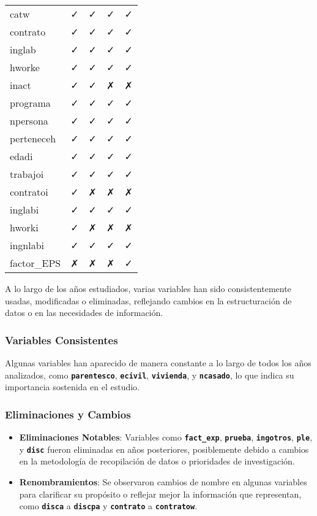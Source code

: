 \documentclass[
]{article}
\begin{document}
\begin{longtable}[]{@{}lllll@{}}
catw & ✓ & ✓ & ✓ & ✓ \\
contrato & ✓ & ✓ & ✓ & ✓ \\
inglab & ✓ & ✓ & ✓ & ✓ \\
hworke & ✓ & ✓ & ✓ & ✓ \\
inact & ✓ & ✓ & ✗ & ✗ \\
programa & ✓ & ✓ & ✓ & ✓ \\
npersona & ✓ & ✓ & ✓ & ✓ \\
perteneceh & ✓ & ✓ & ✓ & ✓ \\
edadi & ✓ & ✓ & ✓ & ✓ \\
trabajoi & ✓ & ✓ & ✓ & ✓ \\
contratoi & ✓ & ✗ & ✗ & ✗ \\
inglabi & ✓ & ✓ & ✓ & ✓ \\
hworki & ✓ & ✗ & ✗ & ✗ \\
ingnlabi & ✓ & ✓ & ✓ & ✓ \\
factor\_EPS & ✗ & ✗ & ✗ & ✓ \\
\end{longtable}

\hfill\break

A lo largo de los años estudiados, varias variables han sido
consistentemente usadas, modificadas o eliminadas, reflejando cambios en
la estructuración de datos o en las necesidades de información.

\hypertarget{variables-consistentes}{%
\subsubsection{\texorpdfstring{\textbf{Variables
Consistentes}}{Variables Consistentes}}\label{variables-consistentes}}

Algunas variables han aparecido de manera constante a lo largo de todos
los años analizados, como \textbf{\texttt{parentesco}},
\textbf{\texttt{ecivil}}, \textbf{\texttt{vivienda}}, y
\textbf{\texttt{ncasado}}, lo que indica su importancia sostenida en el
estudio.

\hypertarget{eliminaciones-y-cambios}{%
\subsubsection{\texorpdfstring{\textbf{Eliminaciones y
Cambios}}{Eliminaciones y Cambios}}\label{eliminaciones-y-cambios}}

\begin{itemize}
\item
  \textbf{Eliminaciones Notables}: Variables como
  \textbf{\texttt{fact\_exp}}, \textbf{\texttt{prueba}},
  \textbf{\texttt{ingotros}}, \textbf{\texttt{ple}}, y
  \textbf{\texttt{disc}} fueron eliminadas en años posteriores,
  posiblemente debido a cambios en la metodología de recopilación de
  datos o prioridades de investigación.
\item
  \textbf{Renombramientos}: Se observaron cambios de nombre en algunas
  variables para clarificar su propósito o reflejar mejor la información
  que representan, como \textbf{\texttt{disca}} a
  \textbf{\texttt{discpa}} y \textbf{\texttt{contrato}} a
  \textbf{\texttt{contratow}}.
\end{itemize}
\end{document}
